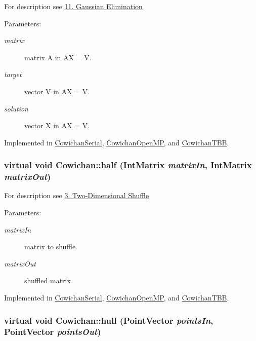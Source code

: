 For description see \hyperlink{index_gauss_sec}{11. Gaussian Elimination} \begin{Desc}
\item[Parameters:]
\begin{description}
\item[{\em matrix}]matrix A in AX = V. \item[{\em target}]vector V in AX = V. \item[{\em solution}]vector X in AX = V. \end{description}
\end{Desc}


Implemented in \hyperlink{class_cowichan_serial_b196d2384c2fe8b185e6269a050399eb}{CowichanSerial}, \hyperlink{class_cowichan_open_m_p_363bcd6f0c7b4d0fced94fe4cd59a267}{CowichanOpenMP}, and \hyperlink{class_cowichan_t_b_b_d51868e0e65482f7c9e69d73b3904822}{CowichanTBB}.\hypertarget{class_cowichan_308603053675bccbe631f04af921f57c}{
\subsubsection[{half}]{\setlength{\rightskip}{0pt plus 5cm}virtual void Cowichan::half ({\bf IntMatrix} {\em matrixIn}, \/  {\bf IntMatrix} {\em matrixOut})}}
\label{class_cowichan_308603053675bccbe631f04af921f57c}


For description see \hyperlink{index_half_sec}{3. Two-Dimensional Shuffle} \begin{Desc}
\item[Parameters:]
\begin{description}
\item[{\em matrixIn}]matrix to shuffle. \item[{\em matrixOut}]shuffled matrix. \end{description}
\end{Desc}


Implemented in \hyperlink{class_cowichan_serial_c08a6b3e23ce26959bac12af077f924f}{CowichanSerial}, \hyperlink{class_cowichan_open_m_p_70989ffe182aebf590e39c56e146b0fb}{CowichanOpenMP}, and \hyperlink{class_cowichan_t_b_b_bbf17e641657d54fc0c571c008ac8f7a}{CowichanTBB}.\hypertarget{class_cowichan_0c6b68ae3c059b66893405f8530a2e0a}{
\subsubsection[{hull}]{\setlength{\rightskip}{0pt plus 5cm}virtual void Cowichan::hull ({\bf PointVector} {\em pointsIn}, \/  {\bf PointVector} {\em pointsOut})}}
\label{class_cowichan_0c6b68ae3c059b66893405f8530a2e0a}


